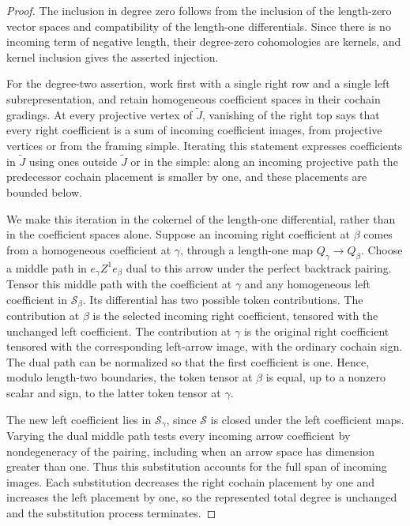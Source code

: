 \begin{proof}
The inclusion in degree zero follows from the inclusion of the
length-zero vector spaces and compatibility of the length-one
differentials.  Since there is no incoming term of negative length,
their degree-zero cohomologies are kernels, and kernel inclusion
gives the asserted injection.

For the degree-two assertion, work first with a single right row
and a single left subrepresentation, and retain homogeneous
coefficient spaces in their cochain gradings.  At every projective
vertex of \(\widetilde J\), vanishing of the right top says that
every right coefficient is a sum of incoming coefficient images,
from projective vertices or from the framing simple.  Iterating
this statement expresses coefficients in \(\widetilde J\) using
ones outside \(\widetilde J\) or in the simple: along an incoming
projective path the predecessor cochain placement is smaller by
one, and these placements are bounded below.

We make this iteration in the cokernel of the length-one
differential, rather than in the coefficient spaces alone.  Suppose
an incoming right coefficient at \(\beta\) comes from a homogeneous
coefficient at \(\gamma\), through a length-one map
\(Q_\gamma\to Q_\beta\).  Choose a middle path in
\(e_\gamma Z^1e_\beta\) dual to this arrow under the perfect
backtrack pairing.  Tensor this middle path with the coefficient
at \(\gamma\) and any homogeneous left coefficient in
\(\mathcal S_\beta\).  Its differential has two possible token
contributions.  The contribution at \(\beta\) is the selected
incoming right coefficient, tensored with the unchanged left
coefficient.  The contribution at \(\gamma\) is the original right
coefficient tensored with the corresponding left-arrow image, with
the ordinary cochain sign.  The dual path can be normalized so that
the first coefficient is one.  Hence, modulo length-two boundaries,
the token tensor at \(\beta\) is equal, up to a nonzero scalar and
sign, to the latter token tensor at \(\gamma\).

The new left coefficient lies in \(\mathcal S_\gamma\), since
\(\mathcal S\) is closed under the left coefficient maps.  Varying
the dual middle path tests every incoming arrow coefficient by
nondegeneracy of the pairing, including when an arrow space has
dimension greater than one.  Thus this substitution accounts for
the full span of incoming images.  Each substitution decreases the
right cochain placement by one and increases the left placement by
one, so the represented total degree is unchanged and the
substitution process terminates.


\end{proof}
